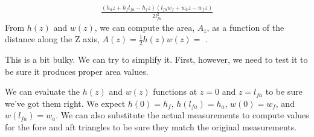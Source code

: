 \documentclass[letterpaper,10pt,english]{sphinxmanual}
\begin{document}
\begin{sphinxVerbatim}[commandchars=\\\{\}]
       
 
\end{sphinxVerbatim}
\begin{equation*}
\begin{split}\displaystyle \frac{\left(h_{a} z + h_{f} l_{fa} - h_{f} z\right) \left(l_{fa} w_{f} + w_{a} z - w_{f} z\right)}{2 l_{fa}^{2}}\end{split}
\end{equation*}
\sphinxAtStartPar
From \(h(z)\) and \(w(z)\), we can compute the area, \(A_z\), as a function of the distance along the Z axis, \(A(z) = \frac{1}{2} h(z) w(z) = \) .

\sphinxAtStartPar
This is a bit bulky. We can try to simplify it. First, however, we need to test it to be sure it produces proper area values.

\sphinxAtStartPar
We can evaluate the \(h(z)\) and \(w(z)\) functions at \(z=0\) and \(z=l_{fa}\) to be sure we’ve got them right.  We expect \(h(0) = h_f\), \(h(l_{fa}) = h_a\), \(w(0) = w_f\), and \(w(l_{fa}) = w_a\). We can also substitute the actual measurements to compute values for the fore and aft triangles to be sure they match the original measurements.
\end{document}
